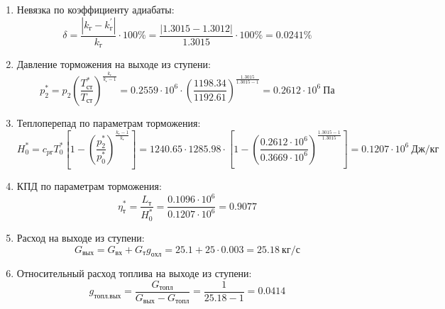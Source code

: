\documentclass[a4paper,10pt]{article}
\begin{document}
\begin{enumerate}
        \item Невязка по коэффициенту адиабаты:
        \[
            \delta = \frac{ \left| k_г - k_г^\prime \right| }{ k_г } \cdot 100 \%=
                \frac{
                    \left| 1.3015 - 1.3012 \right|
                }{
                    1.3015
                } \cdot 100 \% =
            0.0241 \%
        \]

        \item Давление торможения на выходе из ступени:
        \[
            p_2^* = p_2 \left(
                            \frac{ T_{ст}^* }{ T_{ст} }
                    \right) ^ \frac{ k_г }{ k_г - 1 } =
                 0.2559 \cdot 10^6 \cdot \left(
                            \frac{ 1198.34 }{ 1192.61 }
                    \right) ^
                \frac{ 1.3015 }{ 1.3015 - 1 } =
            0.2612 \cdot 10^6 \ Па
        \]

        \item Теплоперепад по параметрам торможения:
        \[
            H_0^* = c_{pг} T_0^* \left[
                        1 - \left(
                                \frac{p_2^*}{p_0^*}
                            \right) ^
                        \frac{k_г - 1}{k_г}
                    \right] =
            1240.65 \cdot 1285.98 \cdot
                    \left[
                        1 - \left(
                                \frac{
                                    0.2612 \cdot 10^6
                                }{
                                    0.3669 \cdot 10^6
                                }
                            \right) ^
                        \frac{1.3015 - 1}{1.3015}
                    \right] =
            0.1207 \cdot 10^6 \ Дж/кг
        \]

        \item КПД по параметрам торможения:
        \[
            \eta_т^* = \frac{ L_т }{ H_0^* } =
                \frac{
                    0.1096 \cdot 10^6
                }{
                    0.1207 \cdot 10^6 } =
            0.9077
        \]

        \item Расход на выходе из ступени:
        \[
            G_{вых} = G_{вх} + G_т g_{охл} =
                25.1 + 25 \cdot
                0.003 =
            25.18 \ кг/с
        \]

        \item Относительный расход топлива на выходе из ступени:
        \[
            g_{топл.вых} = \frac{ G_{топл} }{ G_{вых} - G_{топл} } =
                 \frac{ 1 }{ 25.18 - 1 } =
            0.0414
        \]


\end{enumerate}
\end{document}
